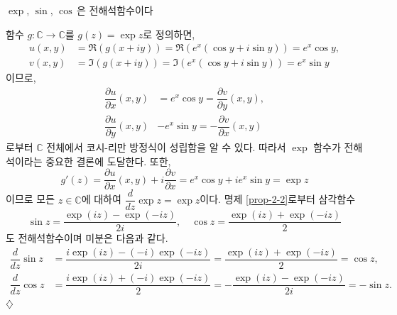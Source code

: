 \begin{saltexample}[label=example-2-8]{$\exp$, $\sin$, $\cos$\,은 전해석함수이다}{}

함수 $g:\mathbb C \to \mathbb C$를 $g(z) = \exp z$로 정의하면,
\begin{align*}
u(x,y) &= \Re(g(x+iy)) = \Re(e^x(\cos y + i\sin y)) = e^x \cos y,\\
v(x,y) &= \Im(g(x+iy)) = \Im(e^x(\cos y + i\sin y)) = e^x \sin y
\end{align*}
이므로, 
\begin{align*}
\dfrac{\partial u}{\partial x}(x,y) &= e^x\cos y 
= \dfrac{\partial v}{\partial y}(x,y), \\
\dfrac{\partial u}{\partial y}(x,y) & -e^x\sin y 
= - \dfrac{\partial v}{\partial x}(x,y)
\end{align*}
로부터 $\mathbb C$ 전체에서 코시-리만 방정식이 성립함을 알 수 있다.
따라서 $\exp$ 함수가 전해석이라는 중요한 결론에 도달한다.
또한, 
\[
g'(z) = \dfrac{\partial u}{\partial x}(x,y) + i\dfrac{\partial v}{\partial x}
= e^x\cos y + i e^x\sin y = \exp z
\]
이므로 모든 $z\in\mathbb C$에 대하여 $\dfrac{d}{dz}\exp z = \exp z$이다.
명제 \ref{prop-2-2}로부터 삼각함수
\[
\sin z  = \dfrac{\exp(iz) - \exp(-iz)}{2i}, \quad
\cos z = \dfrac{\exp(iz) + \exp(-iz)}2
\]
도 전해석함수이며 미분은 다음과 같다.
\begin{align*}
\dfrac{d}{dz} \sin z &= \dfrac{i\exp(iz) - (-i)\exp(-iz)}{2i}
= \dfrac{\exp(iz) + \exp(-iz)}2 = \cos z, \\
\dfrac{d}{dz} \cos z &= \dfrac{i\exp(iz)+(-i)\exp(-iz)}2
= - \dfrac{\exp(iz) - \exp(-iz)}{2i} = - \sin z.
\end{align*}
\hfill $\diamondsuit$
\end{saltexample}


